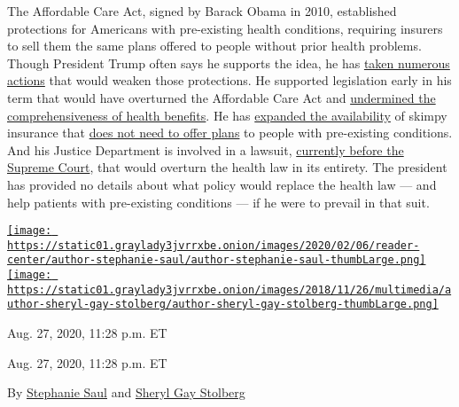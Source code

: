 The Affordable Care Act, signed by Barack Obama in 2010, established
protections for Americans with pre-existing health conditions, requiring
insurers to sell them the same plans offered to people without prior
health problems. Though President Trump often says he supports the idea,
he has
\href{https://slack-redir.net/link?url=https\%3A\%2F\%2Fwww.nytimes3xbfgragh.onion\%2F2020\%2F01\%2F13\%2Fupshot\%2Ftrump-tweets-health-care.html}{taken
numerous actions} that would weaken those protections. He supported
legislation early in his term that would have overturned the Affordable
Care Act and
\href{https://slack-redir.net/link?url=https\%3A\%2F\%2Fwww.nytimes3xbfgragh.onion\%2F2017\%2F04\%2F04\%2Fupshot\%2Ffreedom-caucus-health-care-pre-existing-conditions.html}{undermined
the comprehensiveness of health benefits}. He has
\href{https://slack-redir.net/link?url=https\%3A\%2F\%2Fwww.nytimes3xbfgragh.onion\%2F2018\%2F08\%2F01\%2Fus\%2Fpolitics\%2Ftrump-short-term-health-insurance.html}{expanded
the availability} of skimpy insurance that
\href{https://slack-redir.net/link?url=https\%3A\%2F\%2Fwww.nytimes3xbfgragh.onion\%2F2018\%2F08\%2F01\%2Fupshot\%2Fbuying-short-term-health-insurance-what-to-know.html}{does
not need to offer plans} to people with pre-existing conditions. And his
Justice Department is involved in a lawsuit,
\href{https://slack-redir.net/link?url=https\%3A\%2F\%2Fwww.nytimes3xbfgragh.onion\%2F2020\%2F03\%2F02\%2Fus\%2Fsupreme-court-obamacare-appeal.html}{currently
before the Supreme Court}, that would overturn the health law in its
entirety. The president has provided no details about what policy would
replace the health law --- and help patients with pre-existing
conditions --- if he were to prevail in that suit.

\href{https://www.nytimes3xbfgragh.onion/by/stephanie-saul}{\texttt{[image: https://static01.graylady3jvrrxbe.onion/images/2020/02/06/reader-center/author-stephanie-saul/author-stephanie-saul-thumbLarge.png]}}\href{https://www.nytimes3xbfgragh.onion/by/sheryl-gay-stolberg}{\texttt{[image: https://static01.graylady3jvrrxbe.onion/images/2018/11/26/multimedia/author-sheryl-gay-stolberg/author-sheryl-gay-stolberg-thumbLarge.png]}}

Aug. 27, 2020, 11:28 p.m. ET

Aug. 27, 2020, 11:28 p.m. ET

By \href{https://www.nytimes3xbfgragh.onion/by/stephanie-saul}{Stephanie
Saul} and
\href{https://www.nytimes3xbfgragh.onion/by/sheryl-gay-stolberg}{Sheryl
Gay Stolberg}

